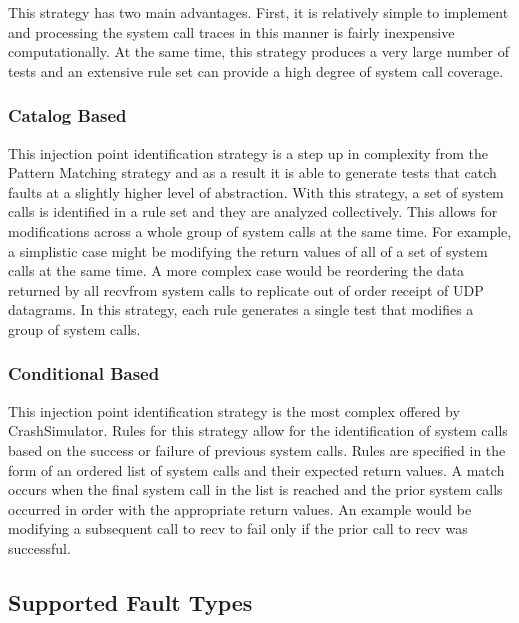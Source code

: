             This strategy has two main advantages. First, it is relatively simple to implement and processing the system
            call traces in this manner is fairly inexpensive computationally. At the same time, this strategy produces a
            very large number of tests and an extensive rule set can provide a high degree of system call coverage.

        \subsubsection{Catalog Based}

            This injection point identification strategy is a step up in complexity from the Pattern Matching strategy
            and as a result it is able to generate tests that catch faults at a slightly higher level of abstraction.
            With this strategy, a set of system calls is identified in a rule set and they are analyzed collectively.
            This allows for modifications across a whole group of system calls at the same time. For example, a
            simplistic case might be modifying the return values of all of a set of system calls at the same time. A
            more complex case would be reordering the data returned by all recvfrom system calls to replicate out of
            order receipt of UDP datagrams.  In this strategy, each rule generates a single test that modifies a group
            of system calls.

        \subsubsection{Conditional Based}

            This injection point identification strategy is the most complex offered by CrashSimulator. Rules for this
            strategy allow for the identification of system calls based on the success or failure of previous system
            calls.  Rules are specified in the form of an ordered list of system calls and their expected return values.
            A match occurs when the final system call in the list is reached and the prior system calls occurred in
            order with the appropriate return values. An example would be modifying a subsequent call to recv to fail
            only if the prior call to recv was successful.

    \subsection{Supported Fault Types}

